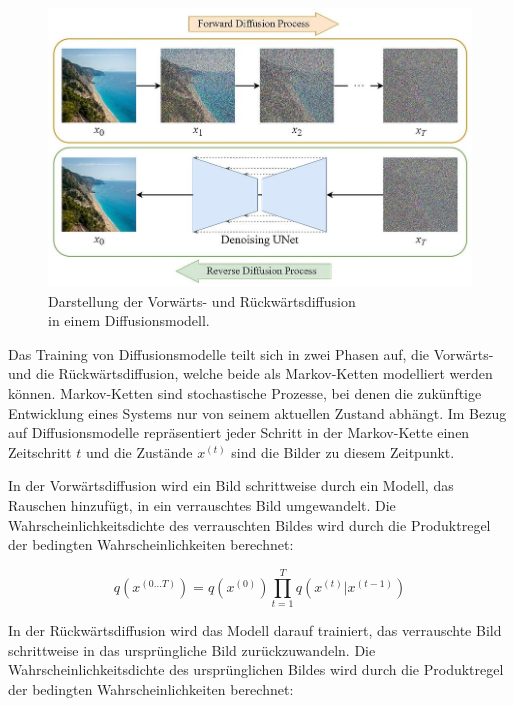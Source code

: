 \begin{figure}[h]
	\centering
	\includegraphics[width=12cm]{figure_stable-diffusion_image.jpg}
	\caption[Darstellung der Vorwärts- und Rückwärtsdiffusion in einem Diffusionsmodell.]{Darstellung der Vorwärts- und Rückwärtsdiffusion\\in einem Diffusionsmodell.}
	\label{fig:regular-diffusion}
\end{figure}

Das Training von Diffusionsmodelle teilt sich in zwei Phasen auf, die Vorwärts- und die Rückwärtsdiffusion, welche beide als Markov-Ketten modelliert werden können. Markov-Ketten sind stochastische Prozesse, bei denen die zukünftige Entwicklung eines Systems nur von seinem aktuellen Zustand abhängt. Im Bezug auf Diffusionsmodelle repräsentiert jeder Schritt in der Markov-Kette einen Zeitschritt $t$ und die Zustände $x^{(t)}$ sind die Bilder zu diesem Zeitpunkt.

In der Vorwärtsdiffusion wird ein Bild schrittweise durch ein Modell, das Rauschen hinzufügt, in ein verrauschtes Bild umgewandelt. Die Wahrscheinlichkeitsdichte des verrauschten Bildes wird durch die Produktregel der bedingten Wahrscheinlichkeiten berechnet:

\begin{equation}
	q \left( x^{(0 \dots T)} \right) = q \left(x^{(0)}\right)\prod_{t=1}^T q \left(x^{(t)}|x^{(t-1)}\right)
	\label{eq:forward-diffusion}
\end{equation}

In der Rückwärtsdiffusion wird das Modell darauf trainiert, das verrauschte Bild schrittweise in das ursprüngliche Bild zurückzuwandeln. Die Wahrscheinlichkeitsdichte des ursprünglichen Bildes wird durch die Produktregel der bedingten Wahrscheinlichkeiten berechnet:

